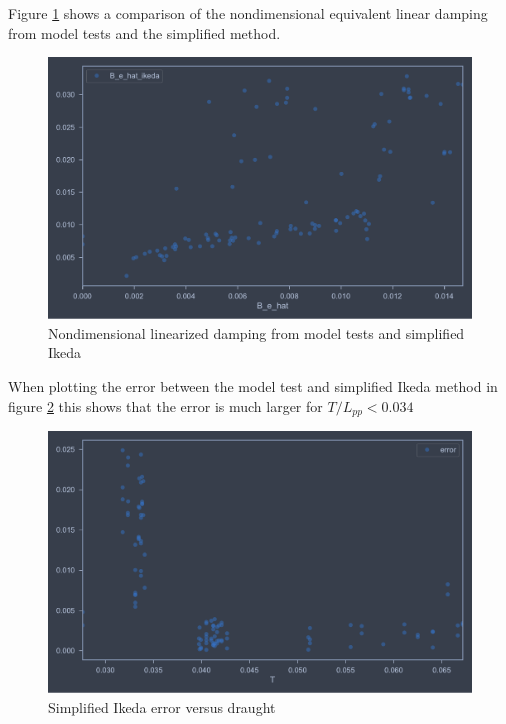 Figure \ref{fig:B_e_hat_ikeda} shows a comparison of the nondimensional equivalent linear damping from model tests and the simplified method.  

\begin{figure}[H]
    \centering
    \includegraphics[width=\columnwidth]{figures/B_e_hat_ikeda.pdf}
    \caption{Nondimensional linearized damping from model tests and simplified Ikeda}
    \label{fig:B_e_hat_ikeda}
\end{figure}

When plotting the error between the model test and simplified Ikeda method in figure \ref{fig:B_e_hat_error} this shows that the error is much larger for $T/L_{pp}<0.034$

\begin{figure}[H]
    \centering
    \includegraphics[width=\columnwidth]{figures/B_e_hat_error.pdf}
    \caption{Simplified Ikeda error versus draught}
    \label{fig:B_e_hat_error}
\end{figure}

